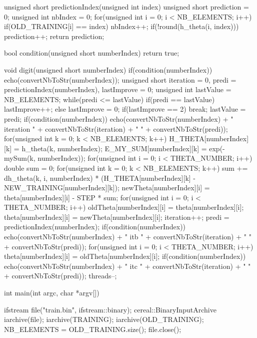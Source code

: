 \documentclass{beamer}
\begin{document}
\begin{casecplusplus}
unsigned short predictionIndex(unsigned int index)
{
    unsigned short prediction = 0;
    unsigned int nbIndex = 0;
    for(unsigned int i = 0; i < NB_ELEMENTS; i++)
        if(OLD_TRAINING[i] == index)
        {
            nbIndex++;
            if(!round(h_theta(i, index)))
                prediction++;
        }
    return prediction;
}

bool condition(unsigned short numberIndex)
{
    return true;
}

void digit(unsigned short numberIndex)
{
    if(condition(numberIndex))
        echo(convertNbToStr(numberIndex));
    unsigned short iteration = 0, predi = predictionIndex(numberIndex), lastImprove = 0;
    unsigned int lastValue = NB_ELEMENTS;
    while(predi <= lastValue)
    {
        if(predi == lastValue) lastImprove++;
        else lastImprove = 0;
        if(lastImprove == 2) break;
        lastValue = predi;
        if(condition(numberIndex))
            echo(convertNbToStr(numberIndex) + " iteration " + convertNbToStr(iteration) + " " + convertNbToStr(predi));
        for(unsigned int k = 0; k < NB_ELEMENTS; k++)
        {
            H_THETA[numberIndex][k] = h_theta(k, numberIndex);
            E_MY_SUM[numberIndex][k] = exp(-mySum(k, numberIndex));
        }
        for(unsigned int i = 0; i < THETA_NUMBER; i++)
        {
            double sum = 0;
            for(unsigned int k = 0; k < NB_ELEMENTS; k++)
                sum += dh_theta(k, i, numberIndex) * (H_THETA[numberIndex][k] - NEW_TRAINING[numberIndex][k]);
            newTheta[numberIndex][i] = theta[numberIndex][i] - STEP * sum;
        }
        for(unsigned int i = 0; i < THETA_NUMBER; i++)
        {
            oldTheta[numberIndex][i] = theta[numberIndex][i];
            theta[numberIndex][i] = newTheta[numberIndex][i];
        }
        iteration++;
        predi = predictionIndex(numberIndex);
    }
    if(condition(numberIndex))
        echo(convertNbToStr(numberIndex) + " itb " + convertNbToStr(iteration) + " " + convertNbToStr(predi));
    for(unsigned int i = 0; i < THETA_NUMBER; i++)
        theta[numberIndex][i] = oldTheta[numberIndex][i];
    if(condition(numberIndex))
        echo(convertNbToStr(numberIndex) + " itc " + convertNbToStr(iteration) + " " + convertNbToStr(predi));
    threads--;
}

int main(int argc, char *argv[])
{
    ifstream file("train.bin", ifstream::binary);
    cereal::BinaryInputArchive iarchive(file);
    iarchive(TRAINING);
    iarchive(OLD_TRAINING);
    NB_ELEMENTS = OLD_TRAINING.size();
    file.close();

}
\end{casecplusplus}
\end{document}
